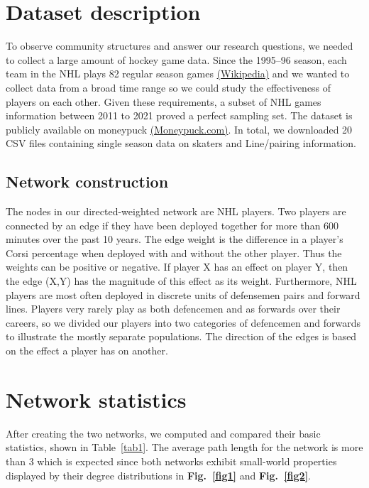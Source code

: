 \documentclass{article}
\begin{document}
\section{Dataset description}
To observe community structures and answer our research questions, we needed to collect a large amount of hockey game data. Since the 1995–96 season, each team in the NHL plays 82 regular season games \href{https://en.wikipedia.org/wiki/Season_structure_of_the_NHL}{(Wikipedia)} and we wanted to collect data from a broad time range so we could study the effectiveness of players on each other. Given these requirements, a subset of NHL games information between 2011 to 2021 proved a perfect sampling set. The dataset is publicly available on moneypuck \href{https://moneypuck.com/data.htm}{(Moneypuck.com)}. In total, we downloaded 20 CSV files containing single season data on skaters and Line/pairing information. 

\subsection{Network construction}
The nodes in our directed-weighted network are NHL players. Two players are connected by an edge if they have been deployed together for more than 600 minutes over the past 10 years. The edge weight is the difference in a player's Corsi percentage when deployed with and without the other player. Thus the weights can be positive or negative. 
If player X has an effect on player Y, then the edge (X,Y) has the magnitude of this effect as its weight.
Furthermore, NHL players are most often deployed in discrete units of defensemen pairs and forward lines. 
Players very rarely play as both defencemen and as forwards over their careers, so we divided our players into two categories of defencemen and forwards to illustrate the mostly separate populations.
The direction of the edges is based on the effect a player has on another.

\section{Network statistics}
After creating the two networks, we computed and compared their basic statistics, shown in Table~\ref{tab1}. The average path length for the network is more than 3 which is expected since both networks exhibit small-world properties displayed by their degree distributions in \textbf{Fig.~\ref{fig1}} and \textbf{Fig.~\ref{fig2}}. 
\end{document}
